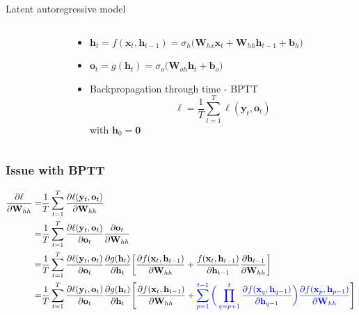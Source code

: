 \documentclass[pressentation,10pt,aspectratio=169,xcolor=table, colorlinks=true]{beamer}
\begin{document}
\begin{frame}{Latent autoregressive model}
\begin{columns}
\begin{column}{0.55\linewidth}
\begin{center}
      \end{center}
    \end{column}
    \begin{column}{0.5\linewidth}
      \begin{itemize}
      \item \(\mathbf{h}_t = f(\mathbf{x}_{t}, \mathbf{h}_{t-1}) = \sigma_{h}\big(\mathbf{W}_{hx}\mathbf{x}_{t} + \mathbf{W}_{hh}\mathbf{h}_{t-1} + \mathbf{b}_h\big)\)
      \item \(\mathbf{o}_t = g(\mathbf{h}_{t}) = \sigma_{o}\big(\mathbf{W}_{oh}\mathbf{h}_t+\mathbf{b}_o\big)\)
      \item Backpropagation through time - BPTT
        \[\ell = \frac{1}{T}\sum_{t=1}^T\ell(\mathbf{y}_{t}, {\mathbf{o}}_{t})\]
        with \(\mathbf{h}_{0}= \mathbf{0}\)
      \end{itemize}
      
    \end{column}
  \end{columns}
\end{frame}

\begin{frame}
  \frametitle{Issue with BPTT}
  \begin{align*}
    \frac{\partial \ell}{\partial \mathbf{W}_{hh}} =&    \frac{1}{T}\sum_{t=1}^T\frac{\partial \ell(\mathbf{y}_{t}, {\mathbf{o}}_{t})}{\partial \mathbf{W}_{hh}} \\
    =&  \frac{1}{T}\sum_{t=1}^T\frac{\partial \ell(\mathbf{y}_{t}, {\mathbf{o}}_{t})}{\partial {\mathbf{o}}_{t}}\frac{\partial{\mathbf{o}}_{t}}{\partial \mathbf{W}_{hh}} \\
    =&  \frac{1}{T}\sum_{t=1}^T\frac{\partial \ell(\mathbf{y}_{t}, {\mathbf{o}}_{t})}{\partial {\mathbf{o}}_{t}}\frac{\partial g(\mathbf{h}_{t})}{\partial\mathbf{h}_t}\bigg[\frac{\partial f(\mathbf{x}_{t}, \mathbf{h}_{t-1})}{\partial \mathbf{W}_{hh}} + \frac{f(\mathbf{x}_{t}, \mathbf{h}_{t-1})}{\partial\mathbf{h}_{t-1}}\frac{\partial \mathbf{h}_{t-1}}{\partial \mathbf{W}_{hh}}\bigg]\\
    =&  \frac{1}{T}\sum_{t=1}^T\frac{\partial \ell(\mathbf{y}_{t}, {\mathbf{o}}_{t})}{\partial {\mathbf{o}}_{t}}\frac{\partial g(\mathbf{h}_{t})}{\partial\mathbf{h}_t}\Bigg[\frac{\partial f(\mathbf{x}_{t}, \mathbf{h}_{t-1})}{\partial \mathbf{W}_{hh}} +  \textcolor{blue}{ \sum_{p=1}^{t-1}\bigg(\prod_{q=p+1}^{t} \frac{\partial f(\mathbf{x}_{q}, \mathbf{h}_{q-1})}{\partial \mathbf{h}_{q-1}} \bigg) \frac{\partial f(\mathbf{x}_{p}, \mathbf{h}_{p-1})}{\partial \mathbf{W}_{hh}}}\Bigg]\\
  \end{align*}
  
\end{frame}
\end{document}
